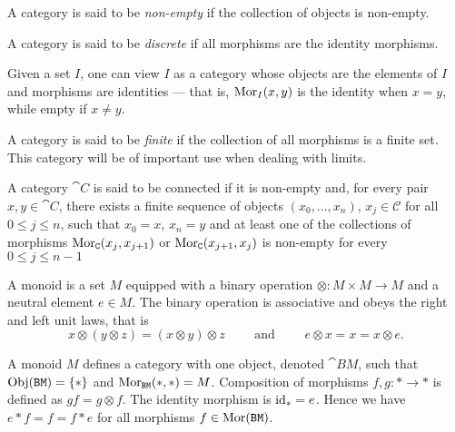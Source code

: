 \begin{definition}
    \label{def:non-empty-category}
    A category is said to be \emph{non-empty} if the collection of objects is
    non-empty.
\end{definition}

\begin{definition}
    \label{def:discrete-category}
    A category is said to be \emph{discrete} if all morphisms are the identity
    morphisms.
\end{definition}

\begin{example}
    \label{exp:index-category}
    Given a set \(I\), one can view \(I\) as a category whose objects are the
    elements of \(I\) and morphisms are identities --- that is, \(\operatorname{Mor}_I(x, y)\) is
    the identity when \(x = y\), while empty if \(x \neq y\).
\end{example}

\begin{definition}
    \label{def:finite-category}
    A category is said to be \emph{finite} if the collection of all morphisms is a
    finite set. This category will be of important use when dealing with limits.
\end{definition}

\begin{definition}
    \label{def:connected-category}
    A category \(\cat C\) is said to be connected if it is non-empty and, for every
    pair \(x, y \in \cat C\), there exists a finite sequence of objects \((x_0,
    \dots, x_n)\), \(x_j \in \mathcal C\) for all \(0 \leq j \leq n\), such that
    \(x_0 = x\), \(x_n = y\) and at least one of the collections of morphisms
    \(\operatorname{Mor}_{\texttt C}(x_j, x_{j+1})\) or \(\operatorname{Mor}_{\texttt C}(x_{j+1}, x_j)\) is non-empty
    for every \(0 \leq j \leq n - 1\)
\end{definition}


\begin{definition}[Monoid]\label{def: monoid}
    A monoid is a set \(M\) equipped with a binary operation \(\otimes: M \times M
    \to M\) and a neutral element \(e \in M\). The binary operation is associative
    and obeys the right and left unit laws, that is
    \[
        x \otimes (y \otimes z) = (x \otimes y) \otimes z \qquad \text{ and } \qquad
        e \otimes x = x = x \otimes e.
    \]
\end{definition}

\begin{example}
    A monoid \(M\) defines a category with one object, denoted \(\cat{BM}\), such
    that \(\operatorname{Obj}(\texttt{BM}) = \{*\}\) and \(\operatorname{Mor}_{\texttt{BM}}(*, *) =
    M\). Composition of morphisms \(f, g: * \to *\) is defined as \(g f = g
    \otimes f\). The identity morphism is \(\operatorname{id}_* = e\). Hence we have \(e * f = f =
    f * e\) for all morphisms \(f \in \operatorname{Mor}(\texttt{BM})\).
\end{example}

